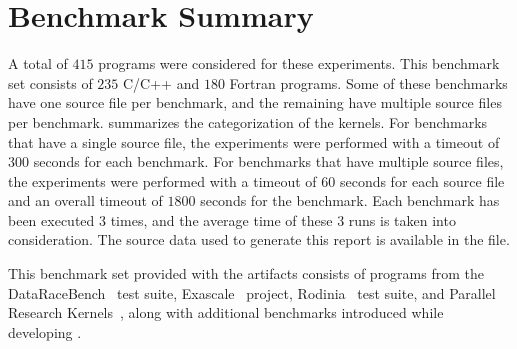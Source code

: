 \section{Benchmark Summary}
A total of $415$ programs were considered for these experiments. This benchmark set consists of $235$ C/C++ and $180$ Fortran programs. Some of these benchmarks have one source file per benchmark, and the remaining have multiple source files per benchmark.  summarizes the categorization of the kernels. For benchmarks that have a single source file, the experiments were performed with a timeout of $300$ seconds for each benchmark. For benchmarks that have multiple source files, the experiments were performed with a timeout of $60$ seconds for each source file and an overall timeout of $1800$ seconds for the benchmark. Each benchmark has been executed $3$ times, and the average time of these $3$ runs is taken into consideration. The source data used to generate this report is available in the  file.

This benchmark set provided with the artifacts consists of programs from the DataRaceBench~\cite{liao2017dataracebench} test suite, Exascale~\cite{exascale} project, Rodinia~\cite{che2009rodinia} test suite, and Parallel Research Kernels~\cite{parres}, along with additional benchmarks introduced while developing \tool.


